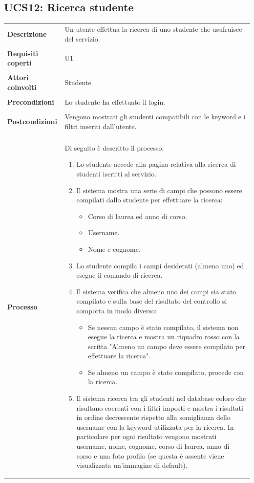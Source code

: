 \documentclass[10pt,a4paper]{report}
\begin{document}
	\subsection{UCS12: Ricerca studente}
	\begin{tabular}{lp{}}
		\textbf{Descrizione}&Un utente effettua la ricerca di uno studente che usufruisce del servizio.\\
		\\
		\textbf{Requisiti coperti}&U1\\
		\\
		\textbf{Attori coinvolti}&Studente\\
		\\
		\textbf{Precondizioni}&Lo studente ha effettuato il login.\\
		\\
		\textbf{Postcondizioni}&Vengono mostrati gli studenti compatibili con le keyword e i filtri inseriti dall'utente.\\
		\\
		\textbf{Processo}&Di seguito è descritto il processo:
		\begin{enumerate}
			\item Lo studente accede alla pagina relativa alla ricerca di studenti iscritti al servizio.
			\item Il sistema mostra una serie di campi che possono essere compilati dallo studente per effettuare la ricerca:
			\begin{itemize}
				\item Corso di laurea ed anno di corso.
				\item Username.
				\item Nome e cognome.			
			\end{itemize}
			\item Lo studente compila i campi desiderati (almeno uno) ed esegue il comando di ricerca.
			\item Il sistema verifica che almeno uno dei campi sia stato compilato e sulla base del risultato del controllo si comporta in modo diverso:
			\begin{itemize}
				\item Se nessun campo è stato compilato, il sistema non esegue la ricerca e mostra un riquadro rosso con la scritta "Almeno un campo deve essere compilato per effettuare la ricerca".
				\item Se almeno un campo è stato compilato, procede con la ricerca.
			\end{itemize}
			\item Il sistema ricerca tra gli studenti nel database coloro che risultano coerenti con i filtri imposti e mostra i risultati in ordine decrescente rispetto alla somiglianza dello username con la keyword utilizzata per la ricerca. In particolare per ogni risultato vengono mostrati username, nome, cognome, corso di laurea, anno di corso e una foto profilo (se questa è assente viene visualizzata un'immagine di default).

\end{enumerate}
\end{tabular}
\end{document}
